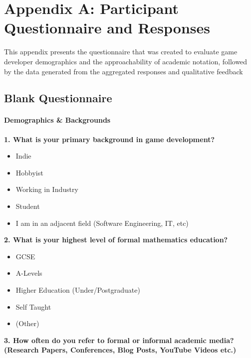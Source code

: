 \chapter{Appendix A: Participant Questionnaire and Responses}
\label{app:questionnaire}

This appendix presents the questionnaire that was created to evaluate game developer demographics and the 
approachability of academic notation, followed by the data generated from the aggregated responses and qualitative feedback

\section{Blank Questionnaire}
\label{sec:blank_questionnaire}

\subsubsection{Demographics \& Backgrounds}

\textbf{1. What is your primary background in game development?}

\begin{itemize}
    \item Indie
    \item Hobbyist
    \item Working in Industry
    \item Student
    \item I am in an adjacent field (Software Engineering, IT, etc)
\end{itemize}

\vspace{2em}

\textbf{2. What is your highest level of formal mathematics education?}

\begin{itemize}
    \item GCSE
    \item A-Levels
    \item Higher Education (Under/Postgraduate)
    \item Self Taught
    \item (Other)
\end{itemize}

\vspace{2em}

\textbf{3. How often do you refer to formal or informal academic media? (Research Papers, Conferences, Blog Posts, YouTube Videos etc.)}

